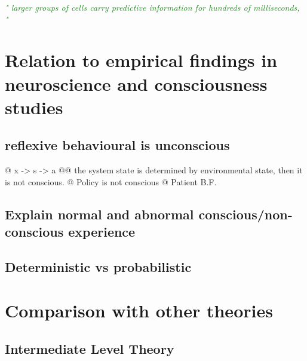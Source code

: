 \documentclass[utf8]{article}
\newenvironment{ants}
			{
			 \begin{easylist}[itemize]
			}
			{
			\end{easylist}
			}
\newcommand{\rewrite}[1]{\textcolor{ForestGreen}{\textit{"#1"}}\newline}
\begin{document}
		\rewrite{ larger groups of cells carry predictive information for hundreds of milliseconds, }
		

	\section{Relation to empirical findings in neuroscience and consciousness studies}
		\subsection{reflexive behavioural is unconscious}
			\begin{ants}
				@ x -> s -> a
					@@ the system state is determined by environmental state, then it is not conscious. 
				@ Policy is not conscious
				@ Patient B.F.
			\end{ants}
		
		\subsection{Explain normal and abnormal conscious/non-conscious experience}
		
		
		
		
			
		\subsection{Deterministic vs probabilistic}
		\cite{dehaene2017consciousness}
		\cite{vul2008temporal, moreno2011bayesian, asplund2014attentional, vul2009attention}
		
	\section{Comparison with other theories}
		\subsection{Intermediate Level Theory}
		
\end{document}

